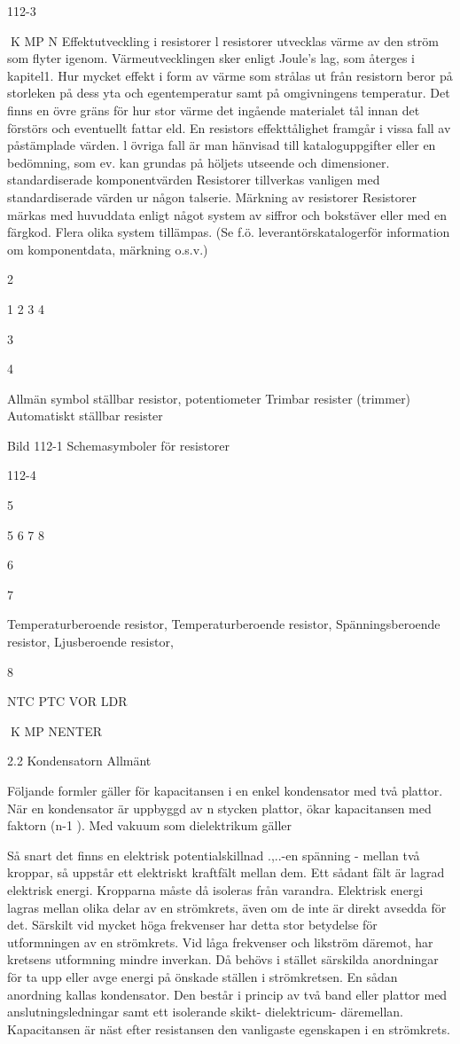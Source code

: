 \documentclass[a4paper,twoside,twocolumn,openright]{book}
\begin{document}
{{112-3

K MP N
Effektutveckling i resistorer
l resistorer utvecklas värme av den ström
som flyter igenom. Värmeutvecklingen sker
enligt Joule's lag, som återges i kapitel1.
Hur mycket effekt i form av värme som
strålas ut från resistorn beror på storleken på
dess yta och egentemperatur samt på omgivningens temperatur. Det finns en övre
gräns för hur stor värme det ingående materialet tål innan det förstörs och eventuellt
fattar eld.
En resistors effekttålighet framgår i vissa
fall av påstämplade värden. l övriga fall är
man hänvisad till kataloguppgifter eller en
bedömning, som ev. kan grundas på höljets
utseende och dimensioner.
standardiserade komponentvärden
Resistorer tillverkas vanligen med standardiserade värden ur någon talserie.
Märkning av resistorer
Resistorer märkas med huvuddata enligt
något system av siffror och bokstäver eller
med en färgkod. Flera olika system tillämpas.
(Se f.ö. leverantörskatalogerför information
om komponentdata, märkning o.s.v.)

2

1
2
3
4

3

4

Allmän symbol
ställbar resistor, potentiometer
Trimbar resister (trimmer)
Automatiskt ställbar resister

Bild 112-1 Schemasymboler för resistorer

112-4

5

5
6
7
8

6

7

Temperaturberoende resistor,
Temperaturberoende resistor,
Spänningsberoende resistor,
Ljusberoende resistor,

8

NTC
PTC
VOR
LDR

K MP NENTER

2.2 Kondensatorn
Allmänt

Följande formler gäller för kapacitansen i
en enkel kondensator med två plattor. När
en kondensator är uppbyggd av n stycken
plattor, ökar kapacitansen med faktorn (n-1 ).
Med vakuum som dielektrikum gäller

Så snart det finns en elektrisk potentialskillnad .,..-en spänning - mellan två kroppar, så
uppstår ett elektriskt kraftfält mellan dem.
Ett sådant fält är lagrad elektrisk energi.
Kropparna måste då isoleras från varandra.
Elektrisk energi lagras mellan olika delar
av en strömkrets, även om de inte är direkt
avsedda för det. Särskilt vid mycket höga
frekvenser har detta stor betydelse för utformningen av en strömkrets. Vid låga frekvenser och likström däremot, har kretsens
utformning mindre inverkan. Då behövs i
stället särskilda anordningar för ta upp eller
avge energi på önskade ställen i strömkretsen.
En sådan anordning kallas kondensator.
Den består i princip av två band eller plattor
med anslutningsledningar samt ett isolerande skikt- dielektricum- däremellan.
Kapacitansen är näst efter resistansen
den vanligaste egenskapen i en strömkrets.

}}
\end{document}
